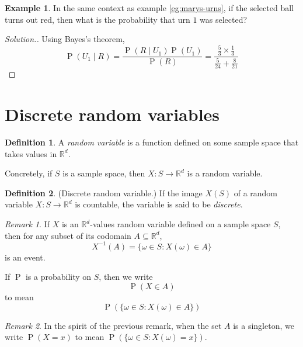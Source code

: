 \documentclass[11pt,letterpaper]{article}
\makeatletter
\theoremstyle{definition}
\newtheorem{defn}{Definition}[section]
\newtheorem{eg}{Example}
\theoremstyle{remark}
\newtheorem{rem}{Remark}[section]
\newenvironment{solution}{
    \let\oldqedsymbol=\qedsymbol%
    \def\@addpunct##1{}%
    \renewcommand{\qedsymbol}{$\blacktriangleleft$}%
    \begin{proof}[\textit Solution.]
}{
    \end{proof}%
    \renewcommand{\qedsymbol}{\oldqedsymbol}
}
\newcommand{\parens}[1]{\left(#1\right)}
\newcommand{\given}{\;\vert\;}
\newcommand{\inv}{^{-1}}
\newcommand{\R}{\mathbb{R}}
\DeclareMathOperator{\Prob}{P}
\renewcommand{\P}[1]{\Prob{\parens{#1}}}
\makeatother
\begin{document}
\begin{eg}
    In the same context as example \ref{eg:marys-urns}, if the selected ball
    turns out red, then what is the probability that urn $1$ was selected?
\end{eg}

\begin{solution}
    Using Bayes's theorem,
    \begin{equation*}
        \P{U_1 \given R}
        = \frac{\P{R \given U_1} \P{U_1}}{\P{R}}
        = \frac{\frac{5}{3} \times \frac{1}{3}}{\frac{5}{24} + \frac{8}{21}}
    \end{equation*}
\end{solution}

\section{Discrete random variables}

\begin{defn}
    A \emph{random variable} is a function defined on some sample space that
    takes values in $\R^d$.

    Concretely, if $S$ is a sample space, then $X : S \to \R^d$ is a random
    variable.
\end{defn}

\begin{defn}{(Discrete random variable.)}
    If the image $X(S)$ of a random variable $X : S \to \R^d$ is countable, the
    variable is said to be \emph{discrete}.
\end{defn}

\begin{rem}
    If $X$ is an $\R^d$-values random variable defined on a sample space $S$,
    then for any subset of its codomain $A \subseteq \R^d$,
    \begin{equation}
        \label{eq:random-variable-preimage}
        X\inv (A) = \{\omega \in S : X(\omega) \in A\}
    \end{equation}
    is an event.

    If $\Prob$ is a probability on $S$, then we write
    \begin{equation*}
        \P{X \in A}
    \end{equation*}
    to mean
    \begin{equation*}
        \P{\{\omega \in S : X(\omega) \in A\}}
    \end{equation*}
\end{rem}

\begin{rem}
    In the spirit of the previous remark, when the set $A$ is a singleton, we
    write $\P{X = x}$ to mean $\P{\{\omega \in S : X(\omega) = x\}}$.
\end{rem}
\end{document}
